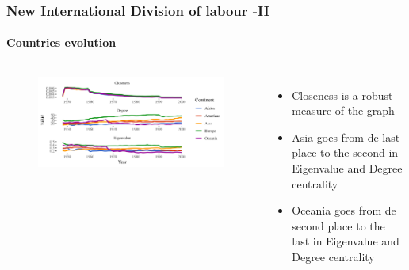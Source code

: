\documentclass[professionalfont,fleqn]{beamer}
\begin{document}
		\begin{frame}
		\frametitle{New International Division of labour -II}
		\framesubtitle{Countries evolution}
		\begin{columns}[c] %
			
			
			\begin{flushleft}
			\begin{figure}
				\includegraphics[width=2\linewidth]{1950_2000_continent_all_presentation}
			\end{figure}
			\end{flushleft}
			
			
			
			\begin{itemize}
				\item<1-> Closeness is a robust measure of the graph
				\item<2-> Asia goes from de last place to the second in Eigenvalue and Degree centrality
				\item<3-> Oceania goes from de second place to the last in Eigenvalue and Degree centrality
			\end{itemize}
		
		\end{columns}
		\end{frame}
		
\end{document}
